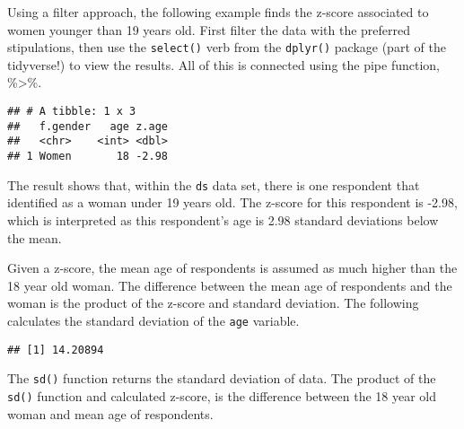 \documentclass[]{article}
\newenvironment{Shaded}{\begin{snugshade}}{\end{snugshade}}
\newcommand{\KeywordTok}[1]{\textcolor[rgb]{0.13,0.29,0.53}{\textbf{#1}}}
\newcommand{\DataTypeTok}[1]{\textcolor[rgb]{0.13,0.29,0.53}{#1}}
\newcommand{\DecValTok}[1]{\textcolor[rgb]{0.00,0.00,0.81}{#1}}
\newcommand{\StringTok}[1]{\textcolor[rgb]{0.31,0.60,0.02}{#1}}
\newcommand{\OtherTok}[1]{\textcolor[rgb]{0.56,0.35,0.01}{#1}}
\newcommand{\OperatorTok}[1]{\textcolor[rgb]{0.81,0.36,0.00}{\textbf{#1}}}
\newcommand{\NormalTok}[1]{#1}
\begin{document}
Using a filter approach, the following example finds the z-score
associated to women younger than 19 years old. First filter the data
with the preferred stipulations, then use the \texttt{select()} verb
from the \texttt{dplyr()} package (part of the tidyverse!) to view the
results. All of this is connected using the pipe function,
\%\textgreater{}\%.

\begin{Shaded}
\end{Shaded}

\begin{verbatim}
## # A tibble: 1 x 3
##   f.gender   age z.age
##   <chr>    <int> <dbl>
## 1 Women       18 -2.98
\end{verbatim}

The result shows that, within the \texttt{ds} data set, there is one
respondent that identified as a woman under 19 years old. The z-score
for this respondent is -2.98, which is interpreted as this respondent's
age is 2.98 standard deviations below the mean.

Given a z-score, the mean age of respondents is assumed as much higher
than the 18 year old woman. The difference between the mean age of
respondents and the woman is the product of the z-score and standard
deviation. The following calculates the standard deviation of the
\texttt{age} variable.

\begin{Shaded}
\end{Shaded}

\begin{verbatim}
## [1] 14.20894
\end{verbatim}

The \texttt{sd()} function returns the standard deviation of data. The
product of the \texttt{sd()} function and calculated z-score, is the
difference between the 18 year old woman and mean age of respondents.
\end{document}
